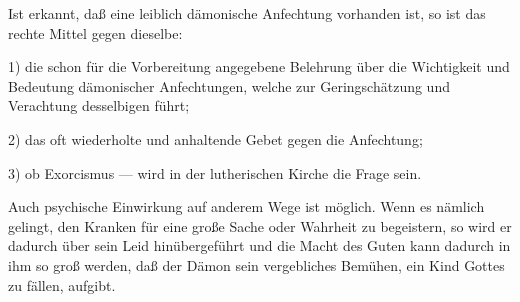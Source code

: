 Ist erkannt, daß eine leiblich dämonische Anfechtung vorhanden ist, so ist das rechte Mittel gegen dieselbe:

1) die schon für die Vorbereitung angegebene Belehrung über die Wichtigkeit und Bedeutung dämonischer Anfechtungen, welche zur Geringschätzung und Verachtung desselbigen führt;

2) das oft wiederholte und anhaltende Gebet gegen die Anfechtung;

3) ob Exorcismus — wird in der lutherischen Kirche die Frage sein.

Auch psychische Einwirkung auf anderem Wege ist möglich. Wenn es nämlich gelingt, den Kranken für eine große Sache oder Wahrheit zu begeistern, so wird er dadurch über sein Leid hinübergeführt und die Macht des Guten kann dadurch in ihm so groß werden, daß der Dämon sein vergebliches Bemühen, ein Kind Gottes zu fällen, aufgibt.

